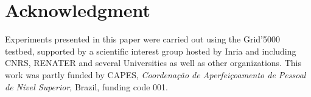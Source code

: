 \documentclass[conference]{IEEEtran}
\begin{document}
\section*{Acknowledgment}
\label{sec:org2cc20fd}
Experiments presented in this paper were carried out using the Grid'5000
testbed, supported by a scientific interest group hosted by Inria and including
CNRS, RENATER and several Universities as well as other organizations.
This work was partly funded by CAPES, \emph{Coordenação de Aperfeiçoamento de Pessoal
de Nível Superior}, Brazil, funding code 001.



\end{document}
